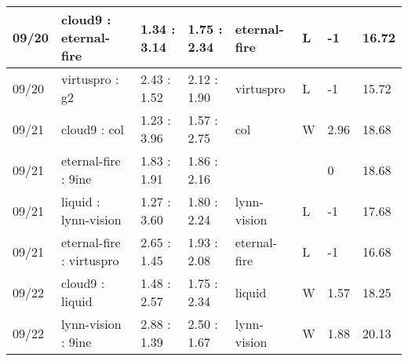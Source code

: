 \begin{small}
\begin{longtable}{|l|l|l|l|l|l|l|l|}
	09/20                               & cloud9 : eternal-fire               & 1.34 : 3.14                             & 1.75 : 2.34                             & eternal-fire                      & L                                 & -1                                   & 16.72                             \\ \hline
	09/20                               & virtuspro : g2                      & 2.43 : 1.52                             & 2.12 : 1.90                             & virtuspro                         & L                                 & -1                                   & 15.72                             \\ \hline
	09/21                               & cloud9 : col                        & 1.23 : 3.96                             & 1.57 : 2.75                             & col                               & W                                 & 2.96                                 & 18.68                             \\ \hline
	09/21                               & eternal-fire : 9ine                 & 1.83 : 1.91                             & 1.86 : 2.16                             &                                   &                                   & 0                                    & 18.68                             \\ \hline
	09/21                               & liquid : lynn-vision                & 1.27 : 3.60                             & 1.80 : 2.24                             & lynn-vision                       & L                                 & -1                                   & 17.68                             \\ \hline
	09/21                               & eternal-fire : virtuspro            & 2.65 : 1.45                             & 1.93 : 2.08                             & eternal-fire                      & L                                 & -1                                   & 16.68                             \\ \hline
	09/22                               & cloud9 : liquid                     & 1.48 : 2.57                             & 1.75 : 2.34                             & liquid                            & W                                 & 1.57                                 & 18.25                             \\ \hline
	09/22                               & lynn-vision : 9ine                  & 2.88 : 1.39                             & 2.50 : 1.67                             & lynn-vision                       & W                                 & 1.88                                 & 20.13                             \\ \hline

\end{longtable}
\end{small}
